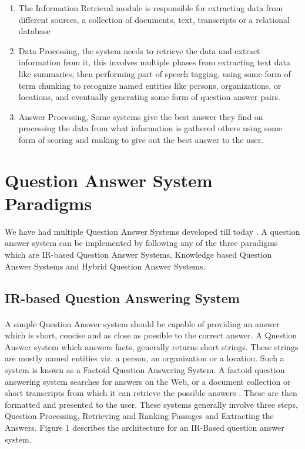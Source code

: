 \begin{enumerate}
\item The Information Retrieval module is responsible for extracting data from different sources, a collection of documents, text, transcripts or a relational database
\item Data Processing, the system needs to retrieve the data and extract information from it, this involves multiple phases from extracting text data like summaries, then performing part of speech tagging, using some form of term chunking to recognize named entities like persons, organizations, or locations, and eventually generating some form of question answer pairs.
\item Answer Processing, Some systems give the best answer they find on processing the data from what information is gathered others using some form of scoring and ranking to give out the best answer to the user.
\end{enumerate}

\section{Question Answer System Paradigms}
We have had multiple Question Answer Systems developed till today \cite {katz1997annotating} \cite {zheng2002answerbus}.
A question answer system can be implemented by following any of the three paradigms \cite {wongso2016literature} which are IR-based Question Answer Systems, Knowledge based Question Answer Systems and Hybrid Question Answer Systems.

\subsection{IR-based Question Answering System}
\paragraph{}
A simple Question Answer system should be capable of providing an answer which is short, concise and as close as possible to the correct answer. A Question Answer system which answers facts, generally returns short strings. These strings are mostly named entities viz. a person, an organization or a location. Such a system is known as a Factoid Question Answering System. A factoid question answering system searches for answers on the Web, or a document collection or short transcripts from which it can retrieve the possible answers \cite {chopra2016named}. These are then formatted and presented to the user. These systems generally involve three steps, Question Processing, Retrieving and Ranking Passages and Extracting the Answers. Figure 1 describes the architecture for an IR-Based question answer system.


